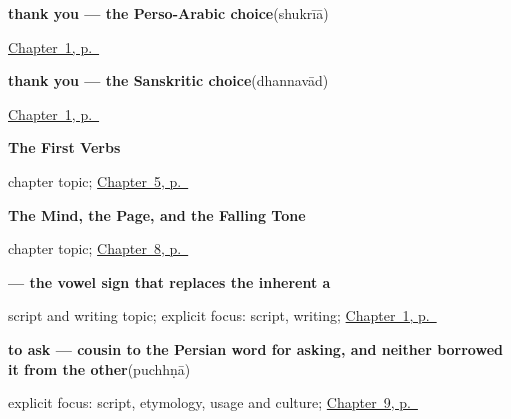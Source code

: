 \noindent\begin{minipage}[t]{\linewidth}
\raggedright
\textbf{thank you — the Perso-Arabic choice}\enspace\emph{}\enspace(shukrīā)\par
\footnotesize \hyperref[ch:greetings]{Chapter~1, p.~\pageref*{ch:greetings}}
\end{minipage}\par\smallskip

\noindent\begin{minipage}[t]{\linewidth}
\raggedright
\textbf{thank you — the Sanskritic choice}\enspace\emph{}\enspace(dhannavād)\par
\footnotesize \hyperref[ch:greetings]{Chapter~1, p.~\pageref*{ch:greetings}}
\end{minipage}\par\smallskip

\noindent\begin{minipage}[t]{\linewidth}
\raggedright
\textbf{The First Verbs}\par
\footnotesize chapter topic; \hyperref[ch:first-verbs]{Chapter~5, p.~\pageref*{ch:first-verbs}}
\end{minipage}\par\smallskip

\noindent\begin{minipage}[t]{\linewidth}
\raggedright
\textbf{The Mind, the Page, and the Falling Tone}\par
\footnotesize chapter topic; \hyperref[ch:pa-mind-and-tone]{Chapter~8, p.~\pageref*{ch:pa-mind-and-tone}}
\end{minipage}\par\smallskip

\noindent\begin{minipage}[t]{\linewidth}
\raggedright
\textbf{ — the vowel sign that replaces the inherent a}\par
\footnotesize script and writing topic; explicit focus: script, writing; \hyperref[ch:greetings]{Chapter~1, p.~\pageref*{ch:greetings}}
\end{minipage}\par\smallskip

\noindent\begin{minipage}[t]{\linewidth}
\raggedright
\textbf{to ask — cousin to the Persian word for asking, and neither borrowed it from the other}\enspace\emph{}\enspace(puchhṇā)\par
\footnotesize explicit focus: script, etymology, usage and culture; \hyperref[ch:pa-taking-and-liking]{Chapter~9, p.~\pageref*{ch:pa-taking-and-liking}}
\end{minipage}\par\smallskip

